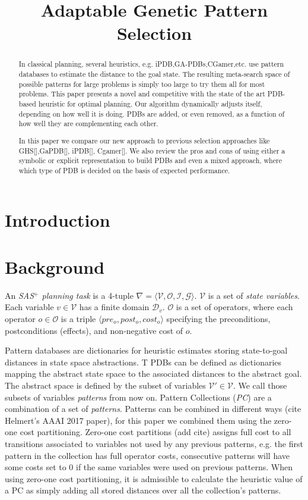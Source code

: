 \documentclass{article}
\title{Adaptable Genetic Pattern Selection}
\newcommand{\mc}{\mathcal}
\begin{document}
\maketitle

\begin{abstract}
In classical planning, several heuristics, e.g. iPDB,GA-PDBs,CGamer,etc. use pattern databases to estimate the distance to the goal state.  The resulting meta-search space of possible patterns for large problems is simply too large to try them all for most problems.  This paper presents a novel and competitive with the state of the art PDB-based heuristic for optimal planning.  Our algorithm dynamically adjusts itself, depending on how well it is doing. PDBs are added, or even removed, as a function of how well they are complementing each other. 

In this paper we compare our new approach to previous selection approaches like GHS[],GaPDB[], iPDB[], Cgamer[].  We also review the pros and cons of using either a symbolic or explicit representation to build PDBs and even a mixed approach, where which type of PDB is decided on the basis of expected performance.
\end{abstract}

\section{Introduction}
\section{Background}

An \emph{SAS$^+$ planning task} {\cite{BN95}} is a 4-tuple $\nabla = \langle\mc{V}, \mc{O}, \mc{I}, \mc{G}\rangle$.  $\mc{V}$ is a set of \emph{state variables}. Each variable $v \in \mc{V}$ has a finite domain $\mc{D}_v$.
$\mc{O}$ is a set of operators, where each operator $o \in \mc{O}$ is a triple $\langle pre_o, post_o, cost_o\rangle$ specifying the preconditions, postconditions (effects), and non-negative cost of $o$.

Pattern databases are dictionaries for heuristic estimates storing state-to-goal distances in state space abstractions. T
PDBs can be defined as dictionaries mapping the abstract state space to the associated distances to the abstract goal.  The abstract space is defined by the subset of variables $\mc{V}' \in \mc{V}$.  We call those subsets of variables \emph{patterns} from now on.
Pattern Collections (\emph{PC}) are a combination of a set of \emph{patterns}.  Patterns can be combined in different ways (cite Helmert's AAAI 2017 paper), for this paper we combined them using the zero-one cost partitioning.  Zero-one cost partitions (add cite) assigns full cost to all transitions associated to variables not used by any previous patterns, e.g. the first pattern in the collection has full operator costs, consecutive patterns will have some costs set to 0 if the same variables were used on previous patterns.  When using zero-one cost partitioning, it is admissible to calculate the heuristic value of a PC as simply adding all stored distances over all the collection's patterns.
\end{document}
